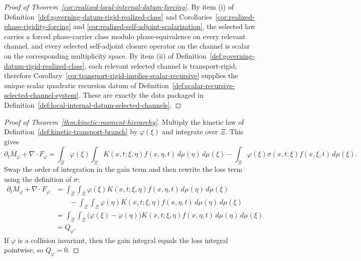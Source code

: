 \begin{proof}[Proof of Theorem~\ref{cor:realized-local-internal-datum-forcing}]
\label{proof:cor:realized-local-internal-datum-forcing}
By item (i) of
Definition~\ref{def:governing-datum-rigid-realized-class} and
Corollaries~\ref{cor:realized-phase-rigidity-forcing} and
\ref{cor:realized-self-adjoint-scalarization}, the selected law carries a
forced phase-carrier class modulo phase-equivalence on every relevant channel,
and every selected self-adjoint closure operator on the channel is scalar on
the corresponding multiplicity space. By item (ii) of
Definition~\ref{def:governing-datum-rigid-realized-class}, each relevant
selected channel is transport-rigid; therefore
Corollary~\ref{cor:transport-rigid-implies-scalar-recursive} supplies the
unique scalar quadratic recursion datum of
Definition~\ref{def:scalar-recursive-selected-channel-system}.
These are exactly the data packaged in
Definition~\ref{def:local-internal-datum-selected-channels}.
\end{proof}


\begin{proof}[Proof of Theorem~\ref{thm:kinetic-moment-hierarchy}]
\label{proof:thm:kinetic-moment-hierarchy}
Multiply the kinetic law of
Definition~\ref{def:kinetic-transport-branch} by \(\varphi(\xi)\) and
integrate over \(\Xi\). This gives
\[
\partial_t M_\varphi + \nabla\!\cdot F_\varphi
=
\int_\Xi \varphi(\xi)\int_\Xi K(x,t;\xi,\eta)f(x,\eta,t)\,d\mu(\eta)\,d\mu(\xi)
-\int_\Xi \varphi(\xi)\sigma(x,t;\xi)f(x,\xi,t)\,d\mu(\xi).
\]
Swap the order of integration in the gain term and then rewrite the loss term
using the definition of \(\sigma\):
\begin{align*}
\partial_t M_\varphi + \nabla\!\cdot F_\varphi
&=
\int_\Xi\int_\Xi \varphi(\xi)K(x,t;\xi,\eta)f(x,\eta,t)\,d\mu(\eta)\,d\mu(\xi) \\
&\qquad
-\int_\Xi\int_\Xi \varphi(\eta)K(x,t;\xi,\eta)f(x,\eta,t)\,d\mu(\eta)\,d\mu(\xi) \\
&=
\int_\Xi\int_\Xi
\bigl(\varphi(\xi)-\varphi(\eta)\bigr)
K(x,t;\xi,\eta)f(x,\eta,t)\,d\mu(\eta)\,d\mu(\xi) \\
&=
Q_\varphi.
\end{align*}
If \(\varphi\) is a collision invariant, then the gain integral equals the
loss integral pointwise, so \(Q_\varphi=0\).
\end{proof}


